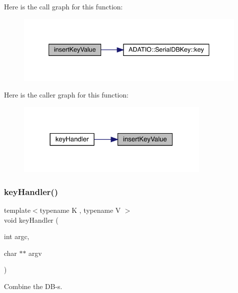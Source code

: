 Here is the call graph for this function\+:
\nopagebreak
\begin{figure}[H]
\begin{center}
\leavevmode
\includegraphics[width=334pt]{d6/d54/adat-devel_2main_2dbutil_2dbavgcors_8cc_a8dcef9d29a9dfc5045f4ee378e94fca3_cgraph}
\end{center}
\end{figure}
Here is the caller graph for this function\+:
\nopagebreak
\begin{figure}[H]
\begin{center}
\leavevmode
\includegraphics[width=265pt]{d6/d54/adat-devel_2main_2dbutil_2dbavgcors_8cc_a8dcef9d29a9dfc5045f4ee378e94fca3_icgraph}
\end{center}
\end{figure}
\mbox{\label{adat-devel_2main_2dbutil_2dbavgcors_8cc_a57918e290614430413950cb4fdfd967e}} 
\subsubsection{\texorpdfstring{keyHandler()}{keyHandler()}}
{\footnotesize\ttfamily template$<$typename K , typename V $>$ \\
void key\+Handler (\begin{DoxyParamCaption}\item[{int}]{argc,  }\item[{char $\ast$$\ast$}]{argv }\end{DoxyParamCaption})}



Combine the D\+B-\/s. 

